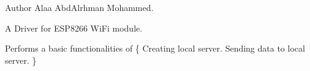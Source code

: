 \begin{DoxyAuthor}{Author}
Alaa Abd\+Alrhman Mohammed.
\end{DoxyAuthor}
A Driver for E\+S\+P8266 Wi\+Fi module.

Performs a basic functionalities of \{ Creating local server. Sending data to local server. \} 